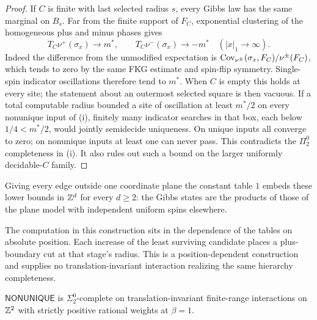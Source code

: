 \begin{proof}
If $C$ is finite with last selected radius $s$, every Gibbs law has the same
marginal on $B_s$. Far from the finite support of $F_C$, exponential clustering
of the homogeneous plus and minus phases gives
\[
 T_C\nu^+(\sigma_x)\longrightarrow m^*,\qquad
 T_C\nu^-(\sigma_x)\longrightarrow -m^*
 \quad (|x|_1\to\infty).
\]
Indeed the difference from the unmodified expectation is
$\operatorname{Cov}_{\nu^\pm}(\sigma_x,F_C)/\nu^\pm(F_C)$, which tends to zero by the
same FKG estimate and spin-flip symmetry. Single-spin indicator oscillations
therefore tend to $m^*$. When $C$ is empty this holds at every site; the
statement about an outermost selected square is then vacuous.
If a total computable radius bounded a site of oscillation at least $m^*/2$
on every nonunique input of (i), finitely many indicator searches in that
box, each below $1/4<m^*/2$, would jointly semidecide uniqueness. On unique
inputs all converge to zero; on nonunique inputs at least one can never pass.
This contradicts the $\Pi^0_2$ completeness in (i). It also rules out such a
bound on the larger uniformly decidable-$C$ family.
\end{proof}

Giving every edge outside one coordinate plane the constant table $1$ embeds these lower bounds in $\mathbb Z^d$ for every $d\ge2$: the Gibbs states are the products of those of the plane model with independent uniform spins elsewhere.

The computation in this construction sits in the dependence of the tables on
absolute position. Each increase of the least surviving candidate places a
plus-boundary cut at that stage's radius. This is a position-dependent
construction and supplies no translation-invariant interaction realizing
the same hierarchy completeness.

\begin{conjecture}\label{conj:ti-sharp}
$\mathsf{NONUNIQUE}$ is $\Sigma^0_2$-complete on translation-invariant
finite-range interactions on $\mathbb Z^2$ with strictly positive rational weights
at $\beta=1$.
\end{conjecture}

